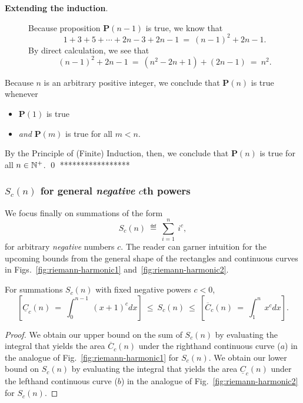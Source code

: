 {\begin{description}
\item[{\bf Extending the induction}.]
%
Because proposition {\bf P}$(n-1)$ is true, we know that
\[ 
 1 + 3 + 5 + \cdots + 2n-3 + 2n-1 \ = \ (n-1)^2 + 2n-1.  \]
By direct calculation, we see that
\[ (n-1)^2 + 2n-1 \ = \ (n^2 -2n +1) + (2n-1) \ = \ n^2. \]
\end{description}
Because $n$ is an arbitrary positive integer, we conclude that
{\bf P}$(n)$ is true whenever
\begin{itemize}
\item
{\bf P}$(1)$ is true
\item
{\em and}
{\bf P}$(m)$ is true for all $m < n$.
\end{itemize}
By the Principle of (Finite) Induction, then, we conclude that {\bf
  P}$(n)$ is true for all $n \in \mathbb{N}^+$.
\qed
*****************}

\subsubsection{$S_c(n)$ for general {\em negative} $c$th powers}
\label{sec:sum-of-i2c<0}

We focus finally on summations of the form
\[ S_c(n) \ \eqdef \ \sum_{i=1}^n \ i^c, \]
for arbitrary {\em negative} numbers $c$.  The reader can garner
intuition for the upcoming bounds from the general shape of the
rectangles and continuous curves in Figs.~\ref{fig:riemann-harmonic1}
and~\ref{fig:riemann-harmonic2}.

\begin{prop}
\label{thm:general-bounds-negative-xc}
For summations $S_c(n)$ with fixed negative powers $c<0$,
\begin{equation} 
\label{eq:general-bounds-negative-xc}
\left[
\underline{C}_c(n) \ = \
\int_0^{n-1} \ (x+1)^c dx
\right]
\ \leq \ S_c(n) \ \leq \
\left[
\overline{C}_c(n) \ = \
\int_1^n \ x^c dx
\right].
\end{equation}
\end{prop}

\begin{proof}
We obtain our upper bound on the sum of $S_c(n)$ by evaluating the
integral that yields the area $\overline{C}_c(n)$ under the righthand
continuous curve ($a$) in the analogue of
Fig.~\ref{fig:riemann-harmonic1} for $S_c(n)$.  We obtain our lower
bound on $S_c(n)$ by evaluating the integral that yields the area
$\underline{C}_c(n)$ under the lefthand continuous curve ($b$) in the
analogue of Fig.~\ref{fig:riemann-harmonic2} for $S_c(n)$.
\end{proof}

